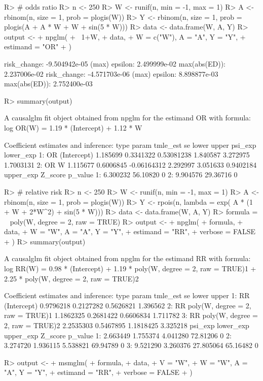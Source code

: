 \documentclass[
]{jss}
\begin{document}
\begin{CodeChunk}
\begin{CodeInput}
R> # odds ratio
R> n <- 250
R> W <- runif(n, min = -1,  max = 1)
R> A <- rbinom(n, size = 1, prob = plogis(W))
R> Y <- rbinom(n, size =  1, prob = plogis(A + A * W + W + sin(5 * W)))
R> data <- data.frame(W, A, Y)
R> output <-
+   npglm(
+     ~1+W,
+     data,
+     W = c("W"), A = "A", Y = "Y",
+     estimand = "OR" 
+   )
\end{CodeInput}
\begin{CodeOutput}
risk_change: -9.504942e-05 (max) epsilon: 2.499999e-02 max(abs(ED)): 2.237006e-02
risk_change: -4.571703e-06 (max) epsilon: 8.898877e-03 max(abs(ED)): 2.752400e-03
\end{CodeOutput}
\begin{CodeInput}
R> summary(output)
\end{CodeInput}
\begin{CodeOutput}
A causalglm fit object obtained from npglm for the estimand OR with formula: 
log OR(W) = 1.19 * (Intercept) + 1.12 * W

Coefficient estimates and inference:
   type       param tmle_est        se       lower    upper  psi_exp lower_exp
1:   OR (Intercept) 1.185699 0.3341322  0.53081238 1.840587 3.272975 1.7003131
2:   OR           W 1.115677 0.6006845 -0.06164312 2.292997 3.051633 0.9402184
   upper_exp  Z_score p_value
1:  6.300232 56.10820       0
2:  9.904576 29.36716       0
\end{CodeOutput}
\begin{CodeInput}
R> # relative risk
R> n <- 250
R> W <- runif(n, min = -1,  max = 1)
R> A <- rbinom(n, size = 1, prob = plogis(W))
R> Y <- rpois(n, lambda = exp( A * (1 + W + 2*W^2)  + sin(5 * W)))
R> data <- data.frame(W, A, Y)
R> formula = ~ poly(W, degree = 2, raw = TRUE) 
R> output <-
+   npglm(
+     formula,
+     data,
+     W = "W", A = "A", Y = "Y",
+     estimand = "RR",
+     verbose = FALSE
+   )
R> summary(output)
\end{CodeInput}
\begin{CodeOutput}
A causalglm fit object obtained from npglm for the estimand RR with formula: 
log RR(W) = 0.98 * (Intercept) + 1.19 * poly(W, degree = 2, raw = TRUE)1 + 2.25 * poly(W, degree = 2, raw = TRUE)2

Coefficient estimates and inference:
   type                            param  tmle_est        se     lower    upper
1:   RR                      (Intercept) 0.9796218 0.2127282 0.5626821 1.396562
2:   RR poly(W, degree = 2, raw = TRUE)1 1.1862325 0.2681422 0.6606834 1.711782
3:   RR poly(W, degree = 2, raw = TRUE)2 2.2535303 0.5467895 1.1818425 3.325218
    psi_exp lower_exp upper_exp  Z_score p_value
1: 2.663449  1.755374  4.041280 72.81206       0
2: 3.274720  1.936115  5.538821 69.94789       0
3: 9.521290  3.260376 27.805064 65.16482       0
\end{CodeOutput}
\begin{CodeInput}
R> output <-
+   msmglm(
+     formula,
+     data,
+     V = "W",
+     W = "W", A = "A", Y = "Y",
+     estimand = "RR",
+     verbose = FALSE
+   )
\end{CodeInput}
\end{CodeChunk}
\end{document}
